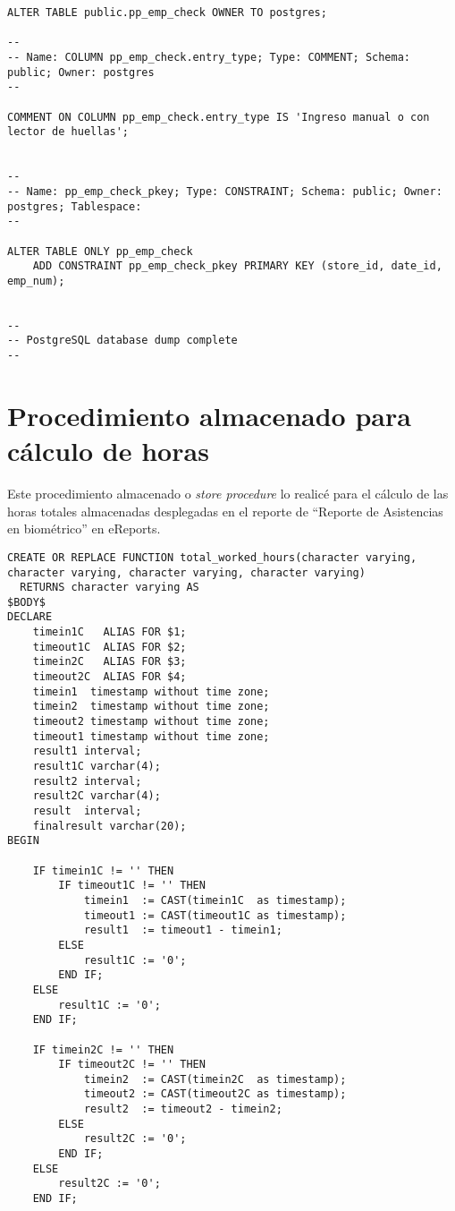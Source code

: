 \begin{appendices}
\begin{Verbatim}[fontsize=\tiny]
ALTER TABLE public.pp_emp_check OWNER TO postgres;

--
-- Name: COLUMN pp_emp_check.entry_type; Type: COMMENT; Schema: public; Owner: postgres
--

COMMENT ON COLUMN pp_emp_check.entry_type IS 'Ingreso manual o con lector de huellas';


--
-- Name: pp_emp_check_pkey; Type: CONSTRAINT; Schema: public; Owner: postgres; Tablespace: 
--

ALTER TABLE ONLY pp_emp_check
    ADD CONSTRAINT pp_emp_check_pkey PRIMARY KEY (store_id, date_id, emp_num);


--
-- PostgreSQL database dump complete
--

\end{Verbatim}

\chapter{Procedimiento almacenado para cálculo de horas}

Este procedimiento almacenado o \textit{store procedure} lo realicé para el cálculo de las horas totales almacenadas desplegadas en el reporte de ``Reporte de Asistencias en biométrico'' en eReports.

\begin{Verbatim}[fontsize=\tiny]
CREATE OR REPLACE FUNCTION total_worked_hours(character varying, character varying, character varying, character varying)
  RETURNS character varying AS
$BODY$
DECLARE
    timein1C   ALIAS FOR $1;
    timeout1C  ALIAS FOR $2;
    timein2C   ALIAS FOR $3;
    timeout2C  ALIAS FOR $4;
    timein1  timestamp without time zone;
    timein2  timestamp without time zone;
    timeout2 timestamp without time zone;
    timeout1 timestamp without time zone;
    result1 interval;
    result1C varchar(4);
    result2 interval;
    result2C varchar(4);
    result  interval;
    finalresult varchar(20);
BEGIN

    IF timein1C != '' THEN
        IF timeout1C != '' THEN
            timein1  := CAST(timein1C  as timestamp);
            timeout1 := CAST(timeout1C as timestamp);
            result1  := timeout1 - timein1;
        ELSE
            result1C := '0';
        END IF;
    ELSE
        result1C := '0';
    END IF;

    IF timein2C != '' THEN
        IF timeout2C != '' THEN
            timein2  := CAST(timein2C  as timestamp);
            timeout2 := CAST(timeout2C as timestamp);
            result2  := timeout2 - timein2;
        ELSE
            result2C := '0';
        END IF;
    ELSE
        result2C := '0';
    END IF;


\end{Verbatim}
\end{appendices}
